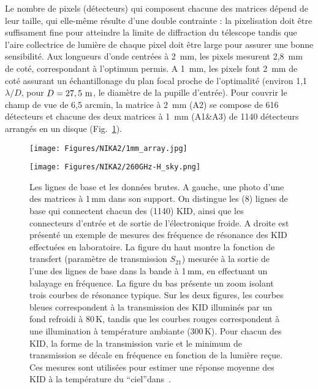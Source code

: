 Le nombre de pixels (détecteurs) qui composent chacune des matrices
dépend de leur taille, qui elle-même résulte d'une double contrainte :
la pixelisation doit être suffisament fine pour atteindre la limite de
diffraction du télescope tandis que l'aire collectrice de lumière de
chaque pixel doit être large pour assurer une bonne sensibilité. Aux
longueurs d'onde centrées à 2~mm, les pixels mesurent 2,8~mm de coté,
correspondant à l'optimum permis. A 1~mm, les pixels font 2~mm de coté
assurant un échantillonage du plan focal proche de l'optimalité
(environ 1,1 $\lambda/D$, pour $D = 27,5~\rm{m}$, le diamètre de la
pupille d'entrée). Pour couvrir le champ de vue de 6,5 arcmin, la
matrice à 2~mm (A2) se compose de 616 détecteurs et chacune des deux
matrices à 1~mm (A1\&A3) de 1140 détecteurs arrangés en un disque
(Fig.~\ref{fig:ma_fig}).


\begin{figure}[!ht]
  \begin{minipage}[c]{0.50\linewidth}
    \centering
    \texttt{[image: Figures/NIKA2/1mm\_array.jpg]}    
  \end{minipage}
  \hfill
  \begin{minipage}[c]{0.50\linewidth}
    \centering
     \texttt{[image: Figures/NIKA2/260GHz-H\_sky.png]}
  \end{minipage}
  \caption{Les lignes de base et les données brutes. A gauche, une
    photo d'une des matrices à 1\,mm dans son support. On distingue
    les (8) lignes de base qui connectent chacun des (1140) KID, ainsi
    que les connecteurs d'entrée et de sortie de l'électronique
    froide. A droite est présenté un exemple de mesures des fréquence
    de résonance des KID effectuées en laboratoire. La figure du haut
    montre la fonction de transfert (paramètre de transmission $S_{21}$)
    mesurée à la sortie de l'une des lignes de base dans la bande à
    1\,mm, en effectuant un balayage en fréquence. La figure du bas
    présente un zoom isolant trois courbes de résonance typique. Sur
    les deux figures, les courbes bleues correspondent à la
    transmission des KID illuminés par un fond refroidi à 80\,K,
    tandis que les courbes rouges correspondent à une illumination à
    température ambiante (300\,K). Pour chacun des KID, la forme de la
    transmission varie et le minimum de transmission se décale en
    fréquence en fonction de la lumière reçue. Ces mesures sont
    utilisées pour estimer une réponse moyenne des KID à la
    température du ``ciel''dans~\citet{Adam2018}.}
  \label{fig:ma_fig}  
\end{figure}
 
